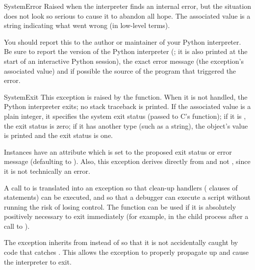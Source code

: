 \begin{excdesc}{SystemError}
  Raised when the interpreter finds an internal error, but the
  situation does not look so serious to cause it to abandon all hope.
  The associated value is a string indicating what went wrong (in
  low-level terms).
  
  You should report this to the author or maintainer of your Python
  interpreter.  Be sure to report the version of the Python
  interpreter (; it is also printed at the start of an
  interactive Python session), the exact error message (the exception's
  associated value) and if possible the source of the program that
  triggered the error.
\end{excdesc}

\begin{excdesc}{SystemExit}
  This exception is raised by the  function.  When it
  is not handled, the Python interpreter exits; no stack traceback is
  printed.  If the associated value is a plain integer, it specifies the
  system exit status (passed to C's  function); if it is
  , the exit status is zero; if it has another type (such as
  a string), the object's value is printed and the exit status is one.

  Instances have an attribute  which is set to the
  proposed exit status or error message (defaulting to ).
  Also, this exception derives directly from  and
  not , since it is not technically an error.

  A call to  is translated into an exception so that
  clean-up handlers ( clauses of  statements)
  can be executed, and so that a debugger can execute a script without
  running the risk of losing control.  The  function
  can be used if it is absolutely positively necessary to exit
  immediately (for example, in the child process after a call to
  ).

  The exception inherits from  instead of
   so that it is not
  accidentally caught by code that catches .  This allows
  the exception to properly propagate up and cause the interpreter to exit.
\end{excdesc}

